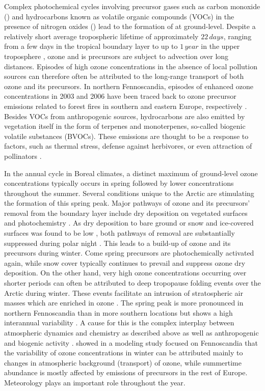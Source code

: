 \documentclass[bg, manuscript]{copernicus}
\begin{document}
Complex photochemical cycles involving precursor gases such as carbon monoxide () and hydrocarbons known as volatile organic compounds (VOCs) in the presence of nitrogen oxides () lead to the formation of  at ground-level. Despite a relatively short average tropospheric lifetime of approximately $22\,\unit{days}$, ranging from a few days in the tropical boundary layer to up to $1\,\unit{year}$ in the upper troposphere \citep{JGR:Stevenson2005,ACP:Young2013}, ozone and is precursors are subject to advection over long distances. Episodes of high ozone concentrations in the absence of local pollution sources can therefore often be attributed to the long-range transport of both ozone and its precursors. In northern Fennoscandia, episodes of enhanced ozone concentrations in 2003 and 2006 have been traced back to ozone precursor emissions related to forest fires in southern and eastern Europe, respectively \citep{AE:Lindskog2007,EP:Karlsson2013}. Besides VOCs from anthropogenic sources, hydrocarbons are also emitted by vegetation itself in the form of terpenes and monoterpenes, so-called biogenic volatile substances (BVOCs). These emissions are thought to be a response to factors, such as thermal stress, defense against herbivores, or even attraction of pollinators \citep{TPS:Penuelas2003}. 

In the annual cycle in Boreal climates, a distinct maximum of ground-level ozone concentrations typically occurs in spring followed by lower concentrations throughout the summer. Several conditions unique to the Arctic are stimulating the formation of this spring peak. Major pathways of ozone and its precursors' removal from the boundary layer include dry deposition on vegetated surfaces and photochemistry \citep{RG:Clifton2020}. As dry deposition to bare ground or snow and ice-covered surfaces was found to be low \citep{ACP:Helmig2007}, both pathways of removal are substantially suppressed during polar night \citep{AE:Monks2000}. This leads to a build-up of ozone and its precursors during winter. Come spring precursors are photochemically activated again, while snow cover typically continues to prevail and suppress ozone dry deposition.
On the other hand, very high ozone concentrations occurring over shorter periods can often be attributed to deep tropopause folding events over the Arctic during winter. These events facilitate an intrusion of stratospheric air masses which are enriched in ozone \citep{JGR:Skerlak2015}.
The spring peak is more pronounced in northern Fennoscandia than in more southern locations but shows a  high interannual variability \citep{AB:Klingberg2009, BER:Klingberg2019}. A cause for this is the complex interplay between atmospheric dynamics and chemistry \citep{AE:Laurila1996,BER:Hatakka2003} as described above as well as anthropogenic and biogenic activity \citep{AE:Rummukainen1996,AE:Simpson2002,QJRMS:Galbally2007,NGS:Schnell2009}. \citet{ACP:Andersson2017} showed in a modeling study focused on Fennoscandia that the variability of ozone concentrations in winter can be attributed mainly to changes in atmospheric background (transport) of ozone, while summertime abundance is mostly affected by emissions of precursors in the rest of Europe. Meteorology plays an important role throughout the year.
\end{document}
